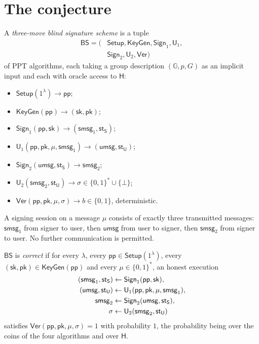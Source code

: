 \documentclass{aicr-conjecture}
\newcommand{\BS}{\mathsf{BS}}
\newcommand{\GG}{\mathbb{G}}
\newcommand{\RO}{\mathsf{H}}
\newcommand{\Setup}{\mathsf{Setup}}
\newcommand{\KeyGen}{\mathsf{KeyGen}}
\newcommand{\Sign}{\mathsf{Sign}}
\newcommand{\Uu}{\mathsf{U}}
\newcommand{\Ver}{\mathsf{Ver}}
\newcommand{\pubp}{\mathsf{pp}}
\newcommand{\seck}{\mathsf{sk}}
\newcommand{\pubk}{\mathsf{pk}}
\newcommand{\smsg}{\mathsf{smsg}}
\newcommand{\umsg}{\mathsf{umsg}}
\newcommand{\stS}{\mathsf{st_S}}
\newcommand{\stU}{\mathsf{st_U}}
\begin{document}
\section{The conjecture}\label{sec:conjectures}

\begin{definition}\label{def:bs}
A \emph{three-move blind signature scheme} is a tuple
\begin{align*}
  \BS = (&\Setup, \KeyGen, \Sign_1, \Uu_1,\\
         &\Sign_2, \Uu_2, \Ver)
\end{align*}
of PPT algorithms, each taking a group description $(\GG, p, G)$ as an
implicit input and each with oracle access to $\RO$:
\begin{itemize}
  \item $\Setup(1^\lambda) \to \pubp$;
  \item $\KeyGen(\pubp) \to (\seck, \pubk)$;
  \item $\Sign_1(\pubp, \seck) \to (\smsg_1, \stS)$;
  \item $\Uu_1(\pubp, \pubk, \mu, \smsg_1) \to (\umsg, \stU)$;
  \item $\Sign_2(\umsg, \stS) \to \smsg_2$;
  \item $\Uu_2(\smsg_2, \stU) \to \sigma \in \{0,1\}^* \cup \{\bot\}$;
  \item $\Ver(\pubp, \pubk, \mu, \sigma) \to b \in \{0,1\}$,
  deterministic.
\end{itemize}
A signing session on a message $\mu$ consists of exactly three transmitted
messages: $\smsg_1$ from signer to user, then $\umsg$ from user to signer,
then $\smsg_2$ from signer to user. No further communication is permitted.
\end{definition}

\begin{definition}[Correctness]\label{def:corr}
$\BS$ is \emph{correct} if for every $\lambda$, every
$\pubp \in \Setup(1^\lambda)$, every
$(\seck, \pubk) \in \KeyGen(\pubp)$ and every $\mu \in \{0,1\}^*$, an
honest execution
\begin{align*}
  (\smsg_1, \stS) &\sample \Sign_1(\pubp, \seck),\\
  (\umsg, \stU) &\sample \Uu_1(\pubp, \pubk, \mu, \smsg_1),\\
  \smsg_2 &\sample \Sign_2(\umsg, \stS),\\
  \sigma &\sample \Uu_2(\smsg_2, \stU)
\end{align*}
satisfies $\Ver(\pubp, \pubk, \mu, \sigma) = 1$ with probability $1$, the
probability being over the coins of the four algorithms and over $\RO$.
\end{definition}
\end{document}
